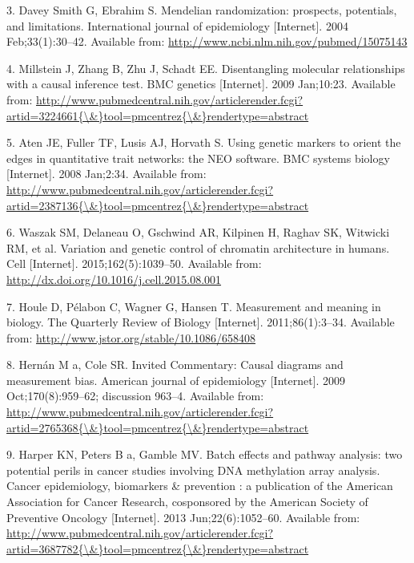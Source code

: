 \documentclass[]{article}
\begin{document}
\hypertarget{ref-DaveySmith2004}{}
3. Davey Smith G, Ebrahim S. Mendelian randomization: prospects,
potentials, and limitations. International journal of epidemiology
{[}Internet{]}. 2004 Feb;33(1):30--42. Available from:
\url{http://www.ncbi.nlm.nih.gov/pubmed/15075143}

\hypertarget{ref-Millstein2009}{}
4. Millstein J, Zhang B, Zhu J, Schadt EE. Disentangling molecular
relationships with a causal inference test. BMC genetics {[}Internet{]}.
2009 Jan;10:23. Available from:
\href{http://www.pubmedcentral.nih.gov/articlerender.fcgi?artid=3224661\%7B/\&\%7Dtool=pmcentrez\%7B/\&\%7Drendertype=abstract}{http://www.pubmedcentral.nih.gov/articlerender.fcgi?artid=3224661\{\textbackslash{}\&\}tool=pmcentrez\{\textbackslash{}\&\}rendertype=abstract}

\hypertarget{ref-Aten2008}{}
5. Aten JE, Fuller TF, Lusis AJ, Horvath S. Using genetic markers to
orient the edges in quantitative trait networks: the NEO software. BMC
systems biology {[}Internet{]}. 2008 Jan;2:34. Available from:
\href{http://www.pubmedcentral.nih.gov/articlerender.fcgi?artid=2387136\%7B/\&\%7Dtool=pmcentrez\%7B/\&\%7Drendertype=abstract}{http://www.pubmedcentral.nih.gov/articlerender.fcgi?artid=2387136\{\textbackslash{}\&\}tool=pmcentrez\{\textbackslash{}\&\}rendertype=abstract}

\hypertarget{ref-Waszak2015}{}
6. Waszak SM, Delaneau O, Gschwind AR, Kilpinen H, Raghav SK, Witwicki
RM, et al. Variation and genetic control of chromatin architecture in
humans. Cell {[}Internet{]}. 2015;162(5):1039--50. Available from:
\url{http://dx.doi.org/10.1016/j.cell.2015.08.001}

\hypertarget{ref-Houle2011}{}
7. Houle D, Pélabon C, Wagner G, Hansen T. Measurement and meaning in
biology. The Quarterly Review of Biology {[}Internet{]}.
2011;86(1):3--34. Available from:
\url{http://www.jstor.org/stable/10.1086/658408}

\hypertarget{ref-Hernan2009}{}
8. Hernán M a, Cole SR. Invited Commentary: Causal diagrams and
measurement bias. American journal of epidemiology {[}Internet{]}. 2009
Oct;170(8):959--62; discussion 963--4. Available from:
\href{http://www.pubmedcentral.nih.gov/articlerender.fcgi?artid=2765368\%7B/\&\%7Dtool=pmcentrez\%7B/\&\%7Drendertype=abstract}{http://www.pubmedcentral.nih.gov/articlerender.fcgi?artid=2765368\{\textbackslash{}\&\}tool=pmcentrez\{\textbackslash{}\&\}rendertype=abstract}

\hypertarget{ref-Harper2013}{}
9. Harper KN, Peters B a, Gamble MV. Batch effects and pathway analysis:
two potential perils in cancer studies involving DNA methylation array
analysis. Cancer epidemiology, biomarkers \& prevention : a publication
of the American Association for Cancer Research, cosponsored by the
American Society of Preventive Oncology {[}Internet{]}. 2013
Jun;22(6):1052--60. Available from:
\href{http://www.pubmedcentral.nih.gov/articlerender.fcgi?artid=3687782\%7B/\&\%7Dtool=pmcentrez\%7B/\&\%7Drendertype=abstract}{http://www.pubmedcentral.nih.gov/articlerender.fcgi?artid=3687782\{\textbackslash{}\&\}tool=pmcentrez\{\textbackslash{}\&\}rendertype=abstract}
\end{document}
